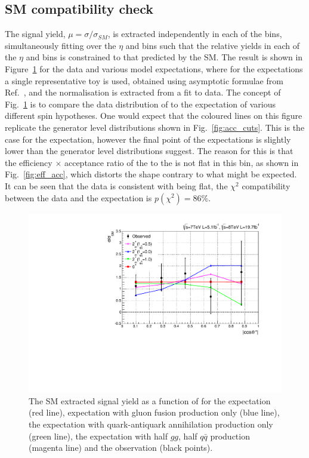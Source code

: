 \subsection{SM compatibility check}
The signal yield, $\mu=\sigma/\sigma_{SM}$, is extracted independently in each of the \abscostheta bins, 
simultaneously fitting over the $\eta$ and \rnine bins such that the relative yields in each of the $\eta$ and \rnine 
bins is constrained to that predicted by the SM. The result is shown in Figure~\ref{fig:channelcomp} for the data and various \twomp model expectations, where for the expectations a single representative toy is used, obtained using asymptotic formulae from Ref.~\cite{asymptotic_form}, and the normalisation is extracted from a fit to data. The concept of Fig.~\ref{fig:channelcomp} is to compare the data distribution of \abscostheta to the expectation of various different spin hypotheses. One would expect that the coloured lines on this figure replicate the generator level distributions shown in Fig.~\ref{fig:acc_cuts}. This is the case for the \SM \zerop expectation, however the final point of the \twomp expectations is slightly lower than the generator level distributions suggest. The reason for this is that the efficiency $\times$ acceptance ratio of the \zerop to the \twomp is not flat in this bin, as shown in Fig.~\ref{fig:eff_acc}, which distorts the shape contrary to what might be expected. It can be seen that the data is consistent with being flat, the $\chi^{2}$ compatibility between the data and the \SM expectation is $p(\chi^{2})=86\%$.

\begin{figure}
  \begin{center}
    \includegraphics[width=0.8\linewidth]{results/plots/chcomp.pdf}
    \caption[The \acs{SM} signal strength extraction in bins of \abscostheta for the spin analyis]{The SM extracted signal yield as a function of \abscostheta for the \zerop expectation (red line), \twomp expectation with gluon fusion production only (blue line), the \twomp expectation with quark-antiquark annihilation production only (green line), the \twomp expectation with half $gg$, half $q\bar{q}$ production (magenta line) and the observation (black points).}
    \label{fig:channelcomp}
  \end{center}
\end{figure}

